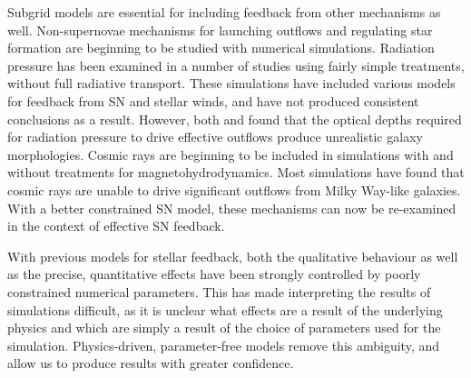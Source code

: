 Subgrid models are essential for including feedback from other mechanisms as
well.  Non-supernovae mechanisms for launching outflows and regulating star
formation are beginning to be studied with numerical simulations.  Radiation
pressure has been examined in a number of studies
\citep{Hopkins2014,Roskar2014,Agertz2015} using fairly simple treatments,
without full radiative transport.  These simulations have included various
models for feedback from SN and stellar winds, and have not produced consistent
conclusions as a result.  However, both \citet{Roskar2014} and
\citet{Agertz2015} found that the optical depths required for radiation pressure
to drive effective outflows produce unrealistic galaxy morphologies.  Cosmic
rays are beginning to be included in simulations with \citep{Girichidis2015} and
without \citep{Jubelgas2008,Booth2013} treatments for magnetohydrodynamics.
Most simulations have found that cosmic rays are unable to drive significant
outflows from Milky Way-like galaxies.  With a better constrained SN model,
these mechanisms can now be re-examined in the context of effective SN feedback.

With previous models for stellar feedback, both the qualitative behaviour as
well as the precise, quantitative effects have been strongly controlled by
poorly constrained numerical parameters.  This has made interpreting the results
of simulations difficult, as it is unclear what effects are a result of
the underlying physics and which are simply a result of the choice of parameters
used for the simulation.  Physics-driven, parameter-free models remove this
ambiguity, and allow us to produce results with greater confidence.  

